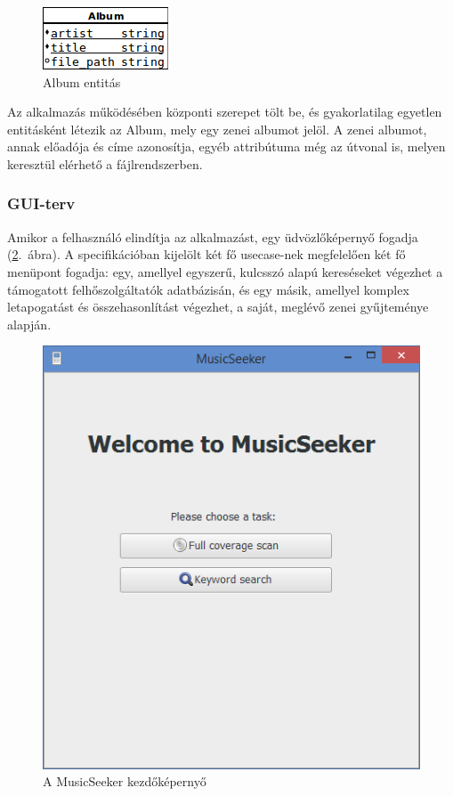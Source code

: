 \begin{figure}[htp]
\centering
\includegraphics[scale=0.6]{img/album.png}
\caption{Album entitás}
\label{fig:album}
\end{figure}

Az alkalmazás működésében központi szerepet tölt be, és gyakorlatilag egyetlen entitásként létezik az Album, mely egy zenei albumot jelöl. A zenei albumot, annak előadója és címe azonosítja, egyéb attribútuma még az útvonal is, melyen keresztül elérhető a fájlrendszerben.



\subsubsection{GUI-terv}
\label{ssub:guidesign}

Amikor a felhasználó elindítja az alkalmazást, egy üdvözlőképernyő fogadja (\ref{fig:scrstart}.~ábra). A specifikációban kijelölt két fő usecase-nek megfelelően két fő menüpont fogadja: egy, amellyel egyszerű, kulcsszó alapú kereséseket végezhet a támogatott felhőszolgáltatók adatbázisán, és egy másik, amellyel komplex letapogatást és összehasonlítást végezhet, a saját, meglévő zenei gyűjteménye alapján.

\begin{figure}[htp]
\centering
\includegraphics[scale=0.4]{img/screenshots/screenshot01.png}
\caption{A MusicSeeker kezdőképernyő}
\label{fig:scrstart}
\end{figure}

